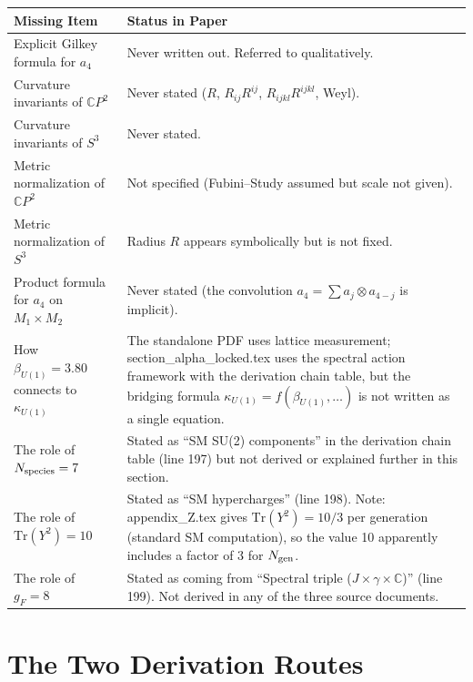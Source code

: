 \documentclass[12pt,a4paper]{article}
\begin{document}
\begin{longtable}{p{}p{}}
\toprule
\textbf{Missing Item} & \textbf{Status in Paper} \\
\midrule
Explicit Gilkey formula for $a_4$ &
  Never written out.  Referred to qualitatively. \\
Curvature invariants of $\mathbb{C}P^2$ &
  Never stated ($R$, $R_{ij}R^{ij}$, $R_{ijkl}R^{ijkl}$, Weyl). \\
Curvature invariants of $S^3$ &
  Never stated. \\
Metric normalization of $\mathbb{C}P^2$ &
  Not specified (Fubini--Study assumed but scale not given). \\
Metric normalization of $S^3$ &
  Radius $R$ appears symbolically but is not fixed. \\
Product formula for $a_4$ on $M_1 \times M_2$ &
  Never stated (the convolution $a_4 = \sum a_j \otimes a_{4-j}$ is implicit). \\
How $\beta_{U(1)} = 3.80$ connects to $\kappa_{U(1)}$ &
  The standalone PDF uses lattice measurement; section\_alpha\_locked.tex
  uses the spectral action framework with the derivation chain table,
  but the bridging formula $\kappa_{U(1)} = f(\beta_{U(1)}, \ldots)$ is
  not written as a single equation. \\
The role of $N_{\rm species} = 7$ &
  Stated as ``SM SU(2) components'' in the derivation chain table (line 197)
  but not derived or explained further in this section. \\
The role of $\mathrm{Tr}(Y^2) = 10$ &
  Stated as ``SM hypercharges'' (line 198).  Note: appendix\_Z.tex gives
  $\mathrm{Tr}(Y^2) = 10/3$ per generation (standard SM computation),
  so the value 10 apparently includes a factor of 3 for $N_{\rm gen}$. \\
The role of $g_F = 8$ &
  Stated as coming from ``Spectral triple ($J \times \gamma \times
  \mathbb{C}$)'' (line 199).  Not derived in any of the three source
  documents. \\
\bottomrule
\end{longtable}

\section{The Two Derivation Routes}
\label{sec:two-routes}
\end{document}
